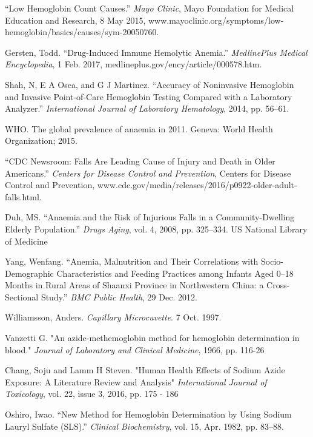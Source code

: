 \documentclass{article}
\begin{document}
\begin{thebibliography}{9}

“Low Hemoglobin Count Causes.” \textit{Mayo Clinic}, Mayo Foundation for Medical Education and Research, 8 May 2015, www.mayoclinic.org/symptoms/low-hemoglobin/basics/causes/sym-20050760.

Gersten, Todd. “Drug-Induced Immune Hemolytic Anemia.” \textit{MedlinePlus Medical Encyclopedia}, 1 Feb. 2017, medlineplus.gov/ency/article/000578.htm.

Shah, N, E A Osea, and G J Martinez. “Accuracy of Noninvasive Hemoglobin and Invasive Point-of-Care Hemoglobin Testing Compared with a Laboratory Analyzer.” \textit{International Journal of Laboratory Hematology}, 2014, pp. 56–61.

WHO. The global prevalence of anaemia in 2011. Geneva: World Health Organization;
2015.

“CDC Newsroom: Falls Are Leading Cause of Injury and Death in Older Americans.” \textit{Centers for Disease Control and Prevention}, Centers for Disease Control and Prevention, www.cdc.gov/media/releases/2016/p0922-older-adult-falls.html.

Duh, MS. “Anaemia and the Risk of Injurious Falls in a Community-Dwelling Elderly Population.” \textit{Drugs Aging}, vol. 4, 2008, pp. 325–334. US National Library of Medicine

Yang, Wenfang. “Anemia, Malnutrition and Their Correlations with Socio-Demographic Characteristics and Feeding Practices among Infants Aged 0–18 Months in Rural Areas of Shaanxi Province in Northwestern China: a Cross-Sectional Study.” \textit{BMC Public Health}, 29 Dec. 2012.

Williamsson, Anders. \textit{Capillary Microcuvette}. 7 Oct. 1997.

Vanzetti G. "An azide-methemoglobin method for hemoglobin determination in blood." \textit{Journal of Laboratory and Clinical Medicine}, 1966, pp. 116-26

Chang, Soju and Lamm H Steven. "Human Health Effects of Sodium Azide Exposure: A Literature Review and Analysis" \textit{International Journal of Toxicology}, vol. 22, issue 3, 2016, pp. 175 - 186

Oshiro, Iwao. “New Method for Hemoglobin Determination by Using Sodium Lauryl Sulfate (SLS).” \textit{Clinical Biochemistry}, vol. 15, Apr. 1982, pp. 83–88.


\end{thebibliography}
\end{document}
